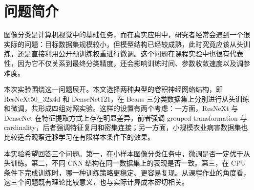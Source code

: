 \section{问题简介}

图像分类是计算机视觉中的基础任务，而在真实应用中，研究者经常会遇到一个很实际的问题：目标数据集规模较小，但模型结构已经较成熟，此时究竟应该从头训练，还是直接利用公开预训练权重进行微调。这个问题在课程实验中也很有代表性，因为它不仅关系到最终分类精度，还会影响训练时间、参数收敛速度以及调参难度。

本次实验围绕这一问题展开。本文选择两种典型的卷积神经网络结构，即 ResNeXt50\_32x4d 和 DenseNet121，在 Beans 三分类数据集上分别进行从头训练和微调，共形成四组对照实验。这样的设置有两个考虑：一方面，ResNeXt 与 DenseNet 在特征提取方式上存在明显差异，前者强调 grouped transformation 与 cardinality，后者强调特征复用和密集连接；另一方面，小规模农业病害数据集也比较适合观察迁移学习在有限样本条件下的效果。

本实验希望回答三个问题。第一，在小样本图像分类任务中，微调是否一定优于从头训练。第二，不同 CNN 结构在同一数据集上的表现是否一致。第三，在 CPU 条件下完成训练时，哪一种训练策略更稳定、更容易复现。从课程作业的角度看，这三个问题既有理论比较意义，也与实际计算成本密切相关。
